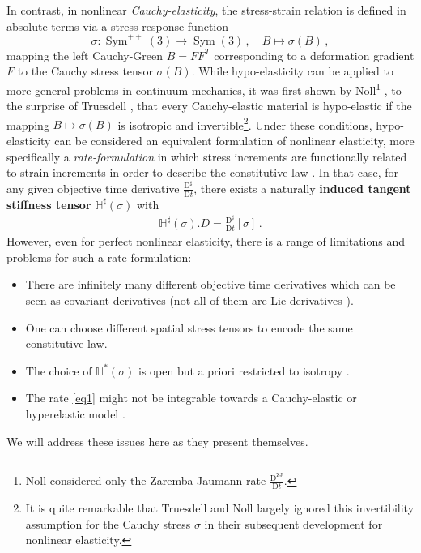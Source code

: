 \documentclass[10pt]{article}
\numberwithin{theoremCounter}{section}
\theoremstyle{plain}
\theoremstyle{definition}
\newcommand{\DD}{\mathrm{D}}
\DeclareMathOperator{\Sym}{Sym}
\DeclareMathOperator{\ZJ}{ZJ}
\def\H{\mathbb{H}}
\numberwithin{equation}{section}
\begin{document}
In contrast, in nonlinear \emph{Cauchy-elasticity}, the stress-strain relation is defined in absolute terms via a stress response function
\[
	\sigma\colon\Sym^{++}(3)\to\Sym(3)\,,\quad B\mapsto\sigma(B)
	\,,
\]
mapping the left Cauchy-Green $B=FF^T$ corresponding to a deformation gradient $F$ to the Cauchy stress tensor $\sigma(B)$. While hypo-elasticity can be applied to more general problems in continuum mechanics, it was first shown by Noll\footnote%
{%
Noll \cite{Noll55} considered only the Zaremba-Jaumann rate $\frac{\DD^{\ZJ}}{\DD t}$.%
} \cite{Noll55}, to the surprise of Truesdell \cite{truesdellremarks}, that every Cauchy-elastic material is hypo-elastic if the mapping $B\mapsto\sigma(B)$ is isotropic and invertible\footnote%
{%
It is quite remarkable that Truesdell and Noll \cite{Truesdell65} largely ignored this invertibility assumption for the Cauchy stress $\sigma$ in their subsequent development for nonlinear elasticity.%
}. Under these conditions, hypo-elasticity can be considered an equivalent formulation of nonlinear elasticity, more specifically a \emph{rate-formulation} in which stress increments are functionally related to strain increments in order to describe the constitutive law \cite{ericksen1958hypo}. In that case, for any given objective time derivative $\frac{\DD^{\sharp}}{\DD t}$, there exists a naturally \textbf{induced tangent stiffness tensor} $\H^{\sharp}(\sigma)$ with
\begin{align}
	\H^{\sharp}(\sigma).D = \frac{\DD^{\sharp}}{\DD t}[\sigma]
	\,.
\end{align}
However, even for perfect nonlinear elasticity, there is a range of limitations and problems for such a rate-formulation:
\begin{itemize}
	\item[1)] There are infinitely many different objective time derivatives which can be seen as covariant derivatives \cite{kolev2024objective} (not all of them are Lie-derivatives \cite{federico2022, kolev2024objective, Marsden83}).
	\item[2)] One can choose different spatial stress tensors to encode the same constitutive law.
	\item[3)] The choice of $\H^*(\sigma)$ is open but a priori restricted to isotropy \cite{Noll55}.
	\item[4)] The rate \eqref{eq1} might not be integrable towards a Cauchy-elastic or hyperelastic model \cite{bernstein1958}.
\end{itemize}
%
We will address these issues here as they present themselves.
\end{document}
